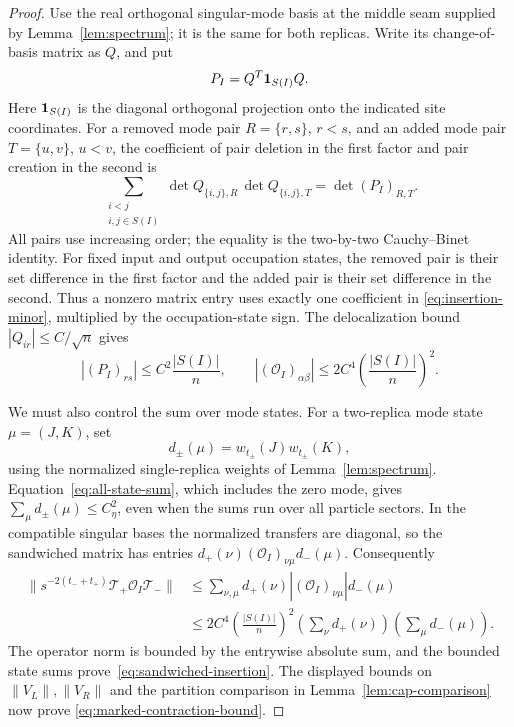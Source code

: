 \begin{proof}
Use the real orthogonal singular-mode basis at the middle seam supplied
by Lemma~\ref{lem:spectrum}; it is the same for both replicas.  Write
its change-of-basis matrix as $Q$, and put
\[
 P_I=Q^T\mathbf 1_{S(I)}Q.
\]
Here $\mathbf 1_{S(I)}$ is the diagonal orthogonal projection onto the indicated
site coordinates.
For a removed mode pair $R=\{r,s\}$, $r<s$, and an added mode pair
$T=\{u,v\}$, $u<v$, the coefficient of pair deletion in the first factor
and pair creation in the second is
\begin{equation}\label{eq:insertion-minor}
 \sum_{\substack{i<j\\i,j\in S(I)}}
       \det Q_{\{i,j\},R}\,\det Q_{\{i,j\},T}
 =\det (P_I)_{R,T}.
\end{equation}
All pairs use increasing order; the equality is the two-by-two
Cauchy--Binet identity.  For fixed input and output occupation states,
the removed pair is their set difference in the first factor and the
added pair is their set difference in the second.  Thus a nonzero
matrix entry uses exactly one coefficient in
\eqref{eq:insertion-minor}, multiplied by the occupation-state sign.
The delocalization bound $|Q_{ir}|\le C/\sqrt n$ gives
\[
 |(P_I)_{rs}|\le C^2\frac{|S(I)|}{n},
 \qquad
 |(\mathcal O_I)_{\alpha\beta}|
       \le 2C^4\left(\frac{|S(I)|}{n}\right)^2.
\]

We must also control the sum over mode states.  For a two-replica mode
state $\mu=(J,K)$, set
\[
 d_\pm(\mu)=w_{t_\pm}(J)w_{t_\pm}(K),
\]
using the normalized single-replica weights of Lemma~\ref{lem:spectrum}.
Equation~\eqref{eq:all-state-sum}, which includes the zero mode, gives
$\sum_\mu d_\pm(\mu)\le C_\eta^2$, even when the sums run over all
particle sectors.  In the compatible singular bases the normalized
transfers are diagonal, so the sandwiched matrix has entries
$d_+(\nu)(\mathcal O_I)_{\nu\mu}d_-(\mu)$.  Consequently
\[
 \begin{split}
 \bigl\|s^{-2(t_-+t_+)}\mathcal T_+\mathcal O_I\mathcal T_-\bigr\|
 &\le\sum_{\nu,\mu}d_+(\nu)
             |(\mathcal O_I)_{\nu\mu}|d_-(\mu)\\
 &\le 2C^4\left(\frac{|S(I)|}{n}\right)^2
       \left(\sum_\nu d_+(\nu)\right)
       \left(\sum_\mu d_-(\mu)\right).
 \end{split}
\]
The operator norm is bounded by the entrywise absolute sum, and the
bounded state sums prove~\eqref{eq:sandwiched-insertion}.
The displayed bounds on $\|V_L\|,\|V_R\|$ and the partition comparison in
Lemma~\ref{lem:cap-comparison} now prove
\eqref{eq:marked-contraction-bound}.
\end{proof}

